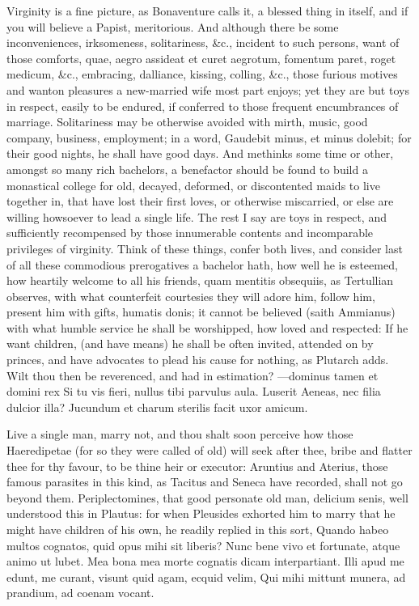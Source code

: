 {Virginity is a fine picture, as Bonaventure calls it, a blessed
thing in itself, and if you will believe a Papist, meritorious. And
although there be some inconveniences, irksomeness, solitariness, \&c.,
incident to such persons, want of those comforts, quae, aegro assideat
et curet aegrotum, fomentum paret, roget medicum, \&c., embracing,
dalliance, kissing, colling, \&c., those furious motives and wanton
pleasures a new-married wife most part enjoys; yet they are but toys in
respect, easily to be endured, if conferred to those frequent
encumbrances of marriage. Solitariness may be otherwise avoided with
mirth, music, good company, business, employment; in a word,
Gaudebit minus, et minus dolebit; for their good nights, he shall
have good days. And methinks some time or other, amongst so many rich
bachelors, a benefactor should be found to build a monastical college
for old, decayed, deformed, or discontented maids to live together in,
that have lost their first loves, or otherwise miscarried, or else are
willing howsoever to lead a single life. The rest I say are toys in
respect, and sufficiently recompensed by those innumerable contents and
incomparable privileges of virginity. Think of these things, confer
both lives, and consider last of all these commodious prerogatives a
bachelor hath, how well he is esteemed, how heartily welcome to all his
friends, quam mentitis obsequiis, as Tertullian observes, with what
counterfeit courtesies they will adore him, follow him, present him
with gifts, humatis donis; it cannot be believed (saith Ammianus)
with what humble service he shall be worshipped, how loved and
respected: If he want children, (and have means) he shall be often
invited, attended on by princes, and have advocates to plead his cause
for nothing, as  Plutarch adds. Wilt thou then be reverenced, and
had in estimation?
---dominus tamen et domini rex
Si tu vis fieri, nullus tibi parvulus aula.
Luserit Aeneas, nec filia dulcior illa?
Jucundum et charum sterilis facit uxor amicum.

Live a single man, marry not, and thou shalt soon perceive how those
Haeredipetae (for so they were called of old) will seek after thee,
bribe and flatter thee for thy favour, to be thine heir or executor:
Aruntius and Aterius, those famous parasites in this kind, as Tacitus
and Seneca have recorded, shall not go beyond them.
Periplectomines, that good personate old man, delicium senis, well
understood this in Plautus: for when Pleusides exhorted him to marry
that he might have children of his own, he readily replied in this
sort,
Quando habeo multos cognatos, quid opus mihi sit liberis?
Nunc bene vivo et fortunate, atque animo ut lubet.
Mea bona mea morte cognatis dicam interpartiant.
Illi apud me edunt, me curant, visunt quid agam, ecquid velim,
Qui mihi mittunt munera, ad prandium, ad coenam vocant.

}
